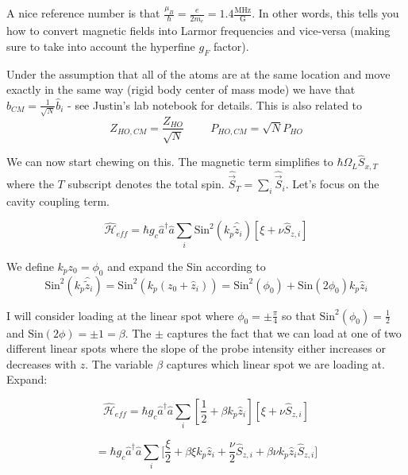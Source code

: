 \documentclass[12pt]{article}
\begin{document}
A nice reference number is that $\frac{\mu_B}{\hbar} = \frac{e}{2m_e} = 1.4 \frac{\text{MHz}}{\text{G}}$. In other words, this tells you how to convert magnetic fields into Larmor frequencies and vice-versa (making sure to take into account the hyperfine $g_F$ factor).



Under the assumption that all of the atoms are at the same location and move exactly in the same way (rigid body center of mass mode) we have that $\hat{b}_{CM} = \frac{1}{\sqrt{N}} \hat{b}_i$ - see Justin's lab notebook for details. This is also related to
\[ Z_{HO,CM} = \frac{Z_{HO}}{\sqrt{N}} \hspace{1cm} P_{HO,CM} = \sqrt{N} P_{HO} \]




We can now start chewing on this. The magnetic term simplifies to $\hbar \Omega_L \hat{S}_{x,T}$ where the $T$ subscript denotes the total spin. $\hat{\vec{S}}_T = \sum_i \hat{\vec{S}}_i$. Let's focus on the cavity coupling term.

\begin{equation}
\widehat{\mathcal{H}}_{eff} = \hbar g_c \hat{a}^{\dag} \hat{a} \sum_i \text{Sin}^2(k_p \hat{\tilde{z}}_i) \left[ \xi + \nu \hat{S}_{z,i} \right]
\end{equation}

We define $k_p z_0 = \phi_0$ and expand the Sin according to 
\[
\text{Sin}^2(k_p \hat{\tilde{z}}_i) = 
\text{Sin}^2(k_p (z_0+\hat{z}_i)) = 
\text{Sin}^2(\phi_0) + \text{Sin}(2\phi_0) k_p \hat{z}_i
\]

I will consider loading at the linear spot where $\phi_0=\pm \frac{\pi}{4}$ so that $\text{Sin}^2(\phi_0) = \frac{1}{2}$ and $\text{Sin}(2\phi) = \pm 1 = \beta$. The $\pm$ captures the fact that we can load at one of two different linear spots where the slope of the probe intensity either increases or decreases with $z$. The variable $\beta$ captures which linear spot we are loading at. Expand: 

\begin{equation}
\widehat{\mathcal{H}}_{eff} = \hbar g_c \hat{a}^{\dag} \hat{a} 
\sum_i 
\left[\frac{1}{2} + \beta k_p \hat{z}_i\right]
\left[ \xi + \nu \hat{S}_{z,i} \right]
\end{equation}

\begin{equation}
= \hbar g_c \hat{a}^{\dag} \hat{a} 
\sum_i \big[
\frac{\xi}{2}
+ \beta \xi k_p \hat{z}_i
+ \frac{\nu}{2} \hat{S}_{z,i}
+ \beta \nu k_p \hat{z}_i \hat{S}_{z,i} \big]
\end{equation}
\end{document}
